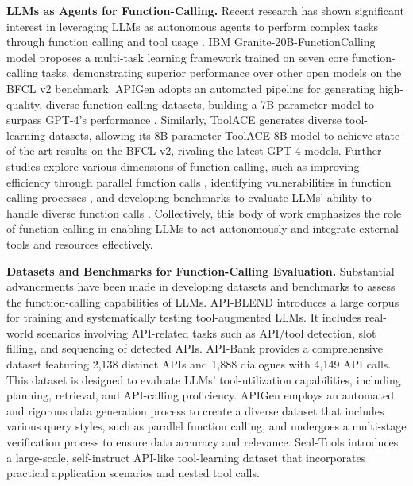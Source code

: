 \documentclass{article}
\begin{document}
\textbf{LLMs as Agents for Function-Calling.}
Recent research has shown significant interest in leveraging LLMs as autonomous agents to perform complex tasks through function calling and tool usage \citep{erdogan2024tinyagent, chen2024octopus}. IBM Granite-20B-FunctionCalling model \citep{abdelaziz2024granite} proposes a multi-task learning framework trained on seven core function-calling tasks, demonstrating superior performance over other open models on the BFCL v2 benchmark. APIGen adopts an automated pipeline for generating high-quality, diverse function-calling datasets, building a 7B-parameter model to surpass GPT-4’s performance \citep{liu2024apigenautomatedpipelinegenerating}. Similarly, ToolACE \citep{liu2024toolacewinningpointsllm} generates diverse tool-learning datasets, allowing its 8B-parameter ToolACE-8B model to achieve state-of-the-art results on the BFCL v2, rivaling the latest GPT-4 models. Further studies explore various dimensions of function calling, such as improving efficiency through parallel function calls \citep{amechanismoffunctioncallsinMSVL}, identifying vulnerabilities in function calling processes \citep{srinivasan2023nexusraven}, and developing benchmarks to evaluate LLMs' ability to handle diverse function calls \citep{pmlr-v235-kim24y}. Collectively, this body of work emphasizes the role of function calling in enabling LLMs to act autonomously and integrate external tools and resources effectively.

\textbf{Datasets and Benchmarks for Function-Calling Evaluation.}
Substantial advancements have been made in developing datasets and benchmarks to assess the function-calling capabilities of LLMs. API-BLEND \citep{basu2024apiblendcomprehensivecorporatraining} introduces a large corpus for training and systematically testing tool-augmented LLMs. It includes real-world scenarios involving API-related tasks such as API/tool detection, slot filling, and sequencing of detected APIs. API-Bank \citep{li2023apibankcomprehensivebenchmarktoolaugmented} provides a comprehensive dataset featuring 2,138 distinct APIs and 1,888 dialogues with 4,149 API calls. This dataset is designed to evaluate LLMs' tool-utilization capabilities, including planning, retrieval, and API-calling proficiency. APIGen \citep{liu2024apigenautomatedpipelinegenerating} employs an automated and rigorous data generation process to create a diverse dataset that includes various query styles, such as parallel function calling, and undergoes a multi-stage verification process to ensure data accuracy and relevance. Seal-Tools \citep{wu2024sealtoolsselfinstructtoollearning} introduces a large-scale, self-instruct API-like tool-learning dataset that incorporates practical application scenarios and nested tool calls.
\end{document}
